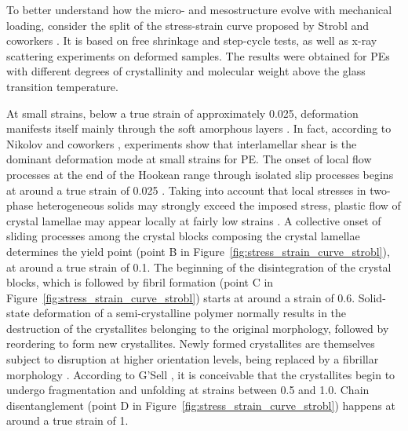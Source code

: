 To better understand how the micro- and mesostructure evolve with mechanical loading, consider the split of the stress-strain curve proposed by Strobl and coworkers \citep{hissNetworkStretchingSlip1999, hobeikaTemperatureStrainRate2000, hongModelTreatingTensile2004, hongModelTreatmentTensile2004, naViscousForceDominatedTensileDeformation2006}.
It is based on free shrinkage and step-cycle tests, as well as x-ray scattering experiments on deformed samples.
The results were obtained for PEs with different degrees of crystallinity and molecular weight above the glass transition temperature.

At small strains, below a true strain of approximately \num{0.025}, deformation manifests itself mainly through the soft amorphous layers \citep{patlazhanStructuralMechanicsSemicrystalline2012}.
In fact, according to Nikolov and coworkers  \citep{nikolovMicroMacroConstitutive2000, nikolovMultiscaleConstitutiveModeling2002}, experiments show that interlamellar shear is the dominant deformation mode at small strains for PE.
The onset of local flow processes at the end of the Hookean range through isolated slip processes begins at around a true strain of \num{0.025} \citep{hissNetworkStretchingSlip1999}.
Taking into account that local stresses in two-phase heterogeneous solids may strongly exceed the imposed stress, plastic flow of crystal lamellae may appear locally at fairly low strains \citep{patlazhanStructuralMechanicsSemicrystalline2012}.
A collective onset of sliding processes among the crystal blocks composing the crystal lamellae determines the yield point (point B in Figure~\ref{fig:stress_strain_curve_strobl}), at around a true strain of 0.1.
The beginning of the disintegration of the crystal blocks, which is followed by fibril formation (point C in Figure~\ref{fig:stress_strain_curve_strobl}) starts at around a strain of 0.6.
Solid-state deformation of a semi-crystalline polymer normally results in the destruction of the crystallites belonging to the original morphology, followed by reordering to form new crystallites.
Newly formed crystallites are themselves subject to disruption at higher orientation levels, being replaced by a fibrillar morphology  \citep{peacockHandbookPolyethyleneStructures2014}.
According to G'Sell \citep{gsellEvolutionMicrostructureSemicrystalline1994}, it is conceivable that the crystallites begin to undergo fragmentation and unfolding at strains between 0.5 and 1.0.
Chain disentanglement (point D in Figure~\ref{fig:stress_strain_curve_strobl}) happens at around a true strain of 1.
